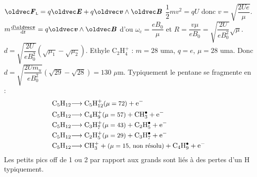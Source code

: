 \begin{solution}
    \begin{questions}
        \questioncours $\vF_\textsc{l} = q\vE + q\vv\wedge\vB$
        \question $\dfrac{1}{2}m v^2 = q U$ donc $v = \sqrt{\dfrac{2Ue}{\mu}}$.
        \question $m\dv{\vv}{t} = q\vv\wedge\vB$ d'ou $\omega_\text{c} = \dfrac{e B_0}{\mu}$ et $R = \dfrac{v \mu}{e B_0} = \sqrt{\dfrac{2U}{e B_0^2}} \sqrt{\mu}$.
        \question $d = \sqrt{\dfrac{2U}{e B_0^2}} (\sqrt{\mu_1} - \sqrt{\mu_2})$.
        \question Ethyle $\mathrm{C_2H_4^+}$ : $m = 28$ uma, $q = e$, $\mu = 28$ uma.
        Donc $d =  \sqrt{\dfrac{2U m_u}{e B_0^2}}(\sqrt{29} - \sqrt{28}) = 130$ $\mu$m.
        \question Typiquement le pentane se fragmente en :
        \begin{align*}
            \mathrm{C_5H_{12}} & \mathrm{\longrightarrow C_5H_{12}^+ \text{\small ($\mu = 72$)} + e^-} \\
            \mathrm{C_5H_{12}} & \mathrm{\longrightarrow C_4H_9^+ \text{\small ($\mu = 57$)} + CH_3^\bullet + e^-} \\
            \mathrm{C_5H_{12}} & \mathrm{\longrightarrow C_3H_7^+ \text{\small ($\mu = 43$)} + C_2H_5^\bullet + e^-} \\
            \mathrm{C_5H_{12}} & \mathrm{\longrightarrow C_2H_5^+ \text{\small ($\mu = 29$)} + C_3H_7^\bullet + e^-} \\
            \mathrm{C_5H_{12}} & \mathrm{\longrightarrow CH_3^+ + \text{\small ($\mu = 15$, non résolu)} + C_4H_9^\bullet + e^-}
        \end{align*}
        Les petits pics off de 1 ou 2 par rapport aux grands sont liés à des pertes d'un H typiquement.
    \end{questions}
\end{solution}